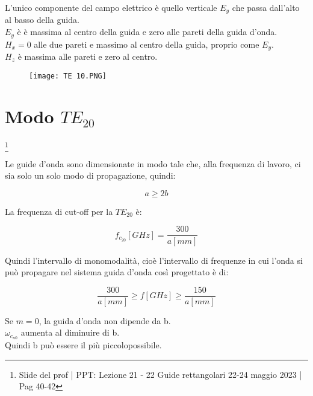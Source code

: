 L'unico componente del campo elettrico è quello verticale $E_y$ che passa dall'alto al basso della guida. \\

$E_y$ è è massima al centro della guida e zero alle pareti della guida d'onda. \\
$H_x = 0$ alle due pareti e massimo al centro della guida, proprio come $E_y$. \\ 
$H_z$ è massima alle pareti e zero al centro. 

\begin{figure}[h]
    \centering
    \texttt{[image: TE 10.PNG]}
\end{figure}  

\newpage 

\section{Modo $TE_{20}$} 

\footnote{Slide del prof | PPT: Lezione 21 - 22 Guide rettangolari 22-24 maggio 2023 | Pag 40-42} 

Le guide d'onda sono dimensionate in modo tale che, alla frequenza di lavoro, 
ci sia solo un solo modo di propagazione, quindi: 

{
    \Large
    \begin{equation}
        a \ge 2b
    \end{equation}
}

La frequenza di cut-off per la $TE_{20}$ è: 

{
    \Large 
    \begin{equation}
        f_{c_{20}} [GHz] = \frac{300}{a [mm]}
    \end{equation}
}

Quindi l'intervallo di monomodalità, cioè l'intervallo di frequenze in cui l'onda si può propagare 
nel sistema guida d'onda così progettato è di: 

{
    \Large 
    \begin{equation}
        \frac{300}{a [mm]} \ge f[GHz] \ge \frac{150}{a [mm]}
    \end{equation}
} 

Se $m=0$, la guida d'onda non dipende da b. \\ 

$\omega_{c_{n0}}$ aumenta al diminuire di b. \\ 

Quindi b può essere il più piccolopossibile. \\ 

